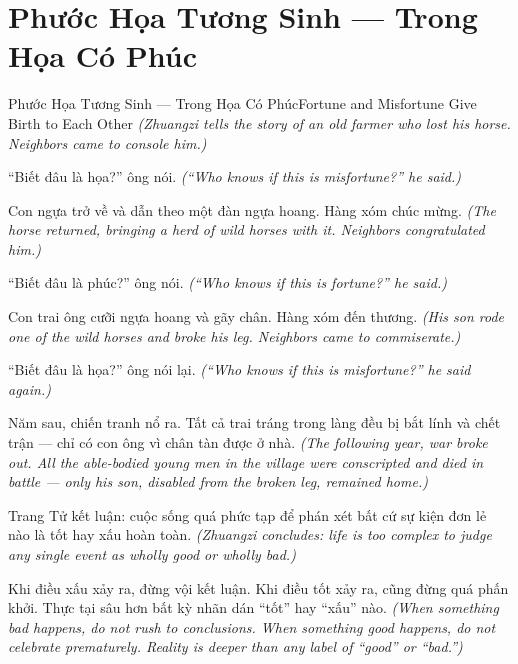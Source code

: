 \section{Phước Họa Tương Sinh — Trong Họa Có Phúc}
\begin{truyen}{Phước Họa Tương Sinh — Trong Họa Có Phúc}{Fortune and Misfortune Give Birth to Each Other}
\textit{(Zhuangzi tells the story of an old farmer who lost his horse. Neighbors came to console him.)}

``Biết đâu là họa?'' ông nói.
\textit{(``Who knows if this is misfortune?'' he said.)}

Con ngựa trở về và dẫn theo một đàn ngựa hoang. Hàng xóm chúc mừng.
\textit{(The horse returned, bringing a herd of wild horses with it. Neighbors congratulated him.)}

``Biết đâu là phúc?'' ông nói.
\textit{(``Who knows if this is fortune?'' he said.)}

Con trai ông cưỡi ngựa hoang và gãy chân. Hàng xóm đến thương.
\textit{(His son rode one of the wild horses and broke his leg. Neighbors came to commiserate.)}

``Biết đâu là họa?'' ông nói lại.
\textit{(``Who knows if this is misfortune?'' he said again.)}

Năm sau, chiến tranh nổ ra. Tất cả trai tráng trong làng đều bị bắt lính và chết trận — chỉ có con ông vì chân tàn được ở nhà.
\textit{(The following year, war broke out. All the able-bodied young men in the village were conscripted and died in battle — only his son, disabled from the broken leg, remained home.)}

Trang Tử kết luận: cuộc sống quá phức tạp để phán xét bất cứ sự kiện đơn lẻ nào là tốt hay xấu hoàn toàn.
\textit{(Zhuangzi concludes: life is too complex to judge any single event as wholly good or wholly bad.)}

\end{truyen}

\begin{baihoc}
Khi điều xấu xảy ra, đừng vội kết luận. Khi điều tốt xảy ra, cũng đừng quá phấn khởi. Thực tại sâu hơn bất kỳ nhãn dán ``tốt'' hay ``xấu'' nào.
\textit{(When something bad happens, do not rush to conclusions. When something good happens, do not celebrate prematurely. Reality is deeper than any label of ``good'' or ``bad.'')}
\end{baihoc}
\ngancach

